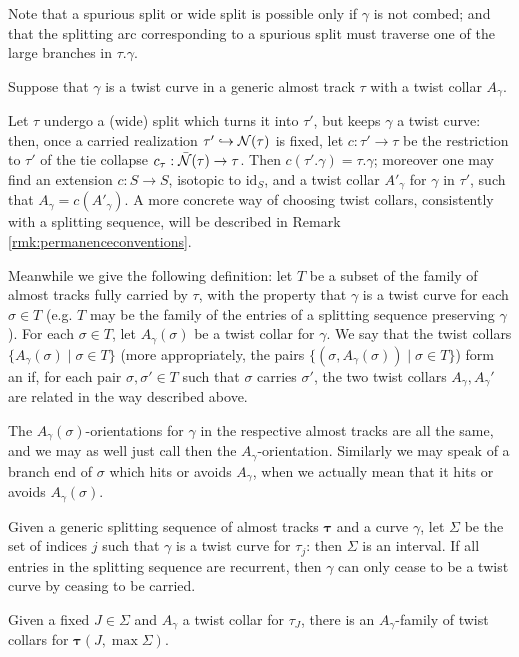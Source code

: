 \begin{rmk}
Note that a spurious split or wide split is possible only if $\gamma$ is not combed; and that the splitting arc corresponding to a spurious split must traverse one of the large branches in $\tau.\gamma$.
\end{rmk}

\begin{rmk}\label{rmk:consistentcollars}
Suppose that $\gamma$ is a twist curve in a generic almost track $\tau$ with a twist collar $A_\gamma$.

Let $\tau$ undergo a (wide) split which turns it into $\tau'$, but keeps $\gamma$ a twist curve: then, once a carried realization $\tau'\hookrightarrow {\mathcal N}(\tau)$ is fixed, let $c:\tau'\rightarrow \tau$ be the restriction to $\tau'$ of the tie collapse $c_\tau:\bar{{\mathcal N}}(\tau)\rightarrow \tau$. Then $c(\tau'.\gamma)=\tau.\gamma$; moreover one may find an extension $c:S\rightarrow S$, isotopic to $\mathrm{id}_S$, and a twist collar $A'_\gamma$ for $\gamma$ in $\tau'$, such that $A_\gamma= c(A'_\gamma)$. A more concrete way of choosing twist collars, consistently with a splitting sequence, will be described in Remark \ref{rmk:permanenceconventions}.

Meanwhile we give the following definition: let $T$ be a subset of the family of almost tracks fully carried by $\tau$, with the property that $\gamma$ is a twist curve for each $\sigma\in T$ (e.g. $T$ may be the family of the entries of a splitting sequence preserving $\gamma$). For each $\sigma\in T$, let $A_\gamma(\sigma)$ be a twist collar for $\gamma$. We say that the twist collars $\{A_\gamma(\sigma)\mid\sigma\in T\}$ (more appropriately, the pairs $\{(\sigma,A_\gamma(\sigma))\mid \sigma\in T\}$) form an  if, for each pair $\sigma,\sigma'\in T$ such that $\sigma$ carries $\sigma'$, the two twist collars $A_\gamma,A_\gamma'$ are related in the way described above.

The $A_\gamma(\sigma)$-orientations for $\gamma$ in the respective almost tracks are all the same, and we may as well just call then the $A_\gamma$-orientation. Similarly we may speak of a branch end of $\sigma$ which hits or avoids $A_\gamma$, when we actually mean that it hits or avoids $A_\gamma(\sigma)$.
\end{rmk}

\begin{lemma}\label{lem:twistcurvebasics}
Given a generic splitting sequence of almost tracks $\bm\tau$ and a curve $\gamma$, let $\Sigma$ be the set of indices $j$ such that $\gamma$ is a twist curve for $\tau_j$: then $\Sigma$ is an interval. If all entries in the splitting sequence are recurrent, then $\gamma$ can only cease to be a twist curve by ceasing to be carried.

Given a fixed $J\in\Sigma$ and $A_\gamma$ a twist collar for $\tau_J$, there is an $A_\gamma$-family of twist collars for $\bm\tau(J,\max \Sigma)$.
\end{lemma}

